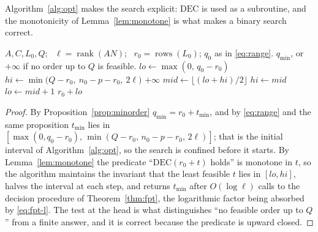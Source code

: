 \documentclass[journal]{IEEEtran}
\theoremstyle{plainn}
\theoremstyle{remark}
\begin{document}
Algorithm~\ref{alg:opt} makes the search explicit: $\mathrm{DEC}$ is used as a subroutine, and the
monotonicity of Lemma~\ref{lem:monotone} is what makes a binary search correct.

\begin{algorithm}[!t]
\caption{Minimum order $\mathrm{OPT}$, with $\mathrm{DEC}$ as a subroutine}
\label{alg:opt}
\begin{algorithmic}[1]
\Require $A,C,L_0,Q$; \ $\ell=\operatorname{rank}(AN)$; \ $r_0=\operatorname{rows}(L_0)$;
$q_0$ as in \eqref{eq:range}.
\Ensure $q_{\min}$, or $+\infty$ if no order up to $Q$ is feasible.
\State $\mathit{lo}\gets\max(0,\,q_0-r_0)$
\State $\mathit{hi}\gets\min\bigl(Q-r_0,\ n_0-p-r_0,\ 2\ell\bigr)$
  \State \Return $+\infty$
\EndIf
{}
  \State $\mathit{mid}\gets\lfloor(\mathit{lo}+\mathit{hi})/2\rfloor$
    \State $\mathit{hi}\gets\mathit{mid}$
  \Else
    \State $\mathit{lo}\gets\mathit{mid}+1$
  \EndIf
\EndWhile
\State \Return $r_0+\mathit{lo}$
\end{algorithmic}
\end{algorithm}

\begin{proof}
By Proposition~\ref{prop:minorder} $q_{\min}=r_0+t_{\min}$, and by \eqref{eq:range} and the same
proposition $t_{\min}$ lies in $[\max(0,q_0-r_0),\,\min(Q-r_0,\,n_0-p-r_0,\,2\ell)]$; that is the
initial interval of Algorithm~\ref{alg:opt}, so the search is confined before it starts. By
Lemma~\ref{lem:monotone} the predicate ``$\mathrm{DEC}(r_0+t)$ holds'' is monotone in $t$, so the
algorithm maintains the invariant that the least feasible $t$ lies in $[\mathit{lo},\mathit{hi}]$,
halves the interval at each step, and returns $t_{\min}$ after $O(\log\ell)$ calls to the decision
procedure of Theorem~\ref{thm:fpt}, the logarithmic factor being absorbed by \eqref{eq:fpt-l}. The
test at the head is what distinguishes ``no feasible order up to $Q$'' from a finite answer, and it
is correct because the predicate is upward closed.
\end{proof}
\end{document}
